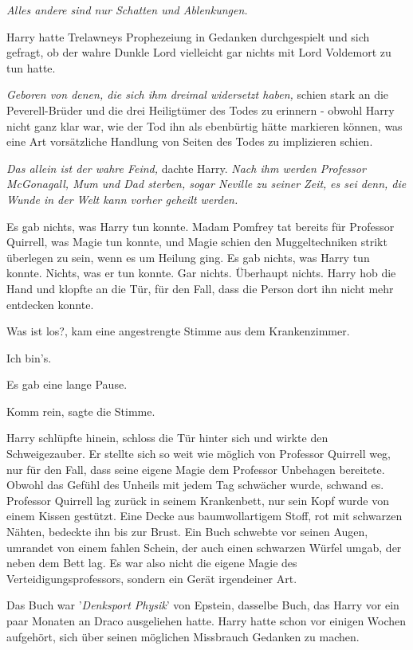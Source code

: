 \emph{Alles andere sind nur Schatten und Ablenkungen.}

Harry hatte Trelawneys Prophezeiung in Gedanken durchgespielt und sich gefragt,
ob der wahre Dunkle Lord vielleicht gar nichts mit Lord Voldemort zu tun hatte.

\emph{Geboren von denen, die sich ihm dreimal widersetzt haben,} schien stark an
die Peverell-Brüder und die drei Heiligtümer des Todes zu erinnern - obwohl
Harry nicht ganz klar war, wie der Tod ihn als ebenbürtig hätte markieren
können, was eine Art vorsätzliche Handlung von Seiten des Todes zu implizieren
schien.

\emph{Das allein ist der wahre Feind,} dachte Harry. \emph{Nach ihm werden
Professor McGonagall, Mum und Dad sterben, sogar Neville zu seiner Zeit,}
\emph{es sei denn, die Wunde in der Welt kann vorher geheilt werden.}

Es gab nichts, was Harry tun konnte. Madam Pomfrey tat bereits für Professor
Quirrell, was Magie tun konnte, und Magie schien den Muggeltechniken strikt
überlegen zu sein, wenn es um Heilung ging. Es gab nichts, was Harry tun konnte.
Nichts, was er tun konnte. Gar nichts. Überhaupt nichts. Harry hob die Hand und
klopfte an die Tür, für den Fall, dass die Person dort ihn nicht mehr entdecken
konnte.

\glqq{}Was ist los?\grqq{}, kam eine angestrengte Stimme aus dem Krankenzimmer.

\glqq{}Ich bin's.\grqq{}

Es gab eine lange Pause.

\glqq{}Komm rein\grqq{}, sagte die Stimme.

Harry schlüpfte hinein, schloss die Tür hinter sich und wirkte den
Schweigezauber. Er stellte sich so weit wie möglich von Professor Quirrell weg,
nur für den Fall, dass seine eigene Magie dem Professor Unbehagen bereitete.
Obwohl das Gefühl des Unheils mit jedem Tag schwächer wurde, schwand es.
Professor Quirrell lag zurück in seinem Krankenbett, nur sein Kopf wurde von
einem Kissen gestützt. Eine Decke aus baumwollartigem Stoff, rot mit schwarzen
Nähten, bedeckte ihn bis zur Brust. Ein Buch schwebte vor seinen Augen, umrandet
von einem fahlen Schein, der auch einen schwarzen Würfel umgab, der neben dem
Bett lag. Es war also nicht die eigene Magie des Verteidigungsprofessors,
sondern ein Gerät irgendeiner Art.

Das Buch war '\emph{Denksport Physik}' von Epstein, dasselbe Buch, das Harry vor
ein paar Monaten an Draco ausgeliehen hatte. Harry hatte schon vor einigen
Wochen aufgehört, sich über seinen möglichen Missbrauch Gedanken zu machen.

